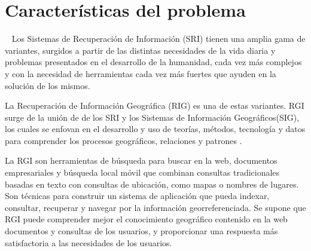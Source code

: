 \section{Características del problema}\label{sec:prob-charact}

~
Los Sistemas de Recuperación de Información (SRI) tienen una amplia gama de
variantes, surgidos a partir de las distintas necesidades de la vida diaria y
problemas presentados en el desarrollo de la humanidad, cada vez más complejos
y con la necesidad de herramientas cada vez más fuertes que ayuden en la
solución de los mismos. 

La Recuperación de Información Geográfica (RIG) es una de estas variantes. RGI
surge de la unión de de los SRI y los Sistemas de Información Geográficos(SIG),
los cuales se enfovan en el desarrollo y uso de teorías, métodos, tecnología y
datos para comprender los procesos geográficos, relaciones y patrones
\cite{chang2016}.


La RGI son herramientas de búsqueda para buscar en la web, documentos
empresariales y búsqueda local móvil que combinan consultas tradicionales
basadas en texto con consultas de ubicación, como mapas o nombres de lugares.
Son técnicas para construir un sistema de aplicación que pueda indexar,
consultar, recuperar y navegar por la información georreferenciada. Se supone
que RGI puede comprender mejor el conocimiento geográfico contenido en la web
documentos y consultas de los usuarios, y proporcionar una respuesta más
satisfactoria a las necesidades de los usuarios.